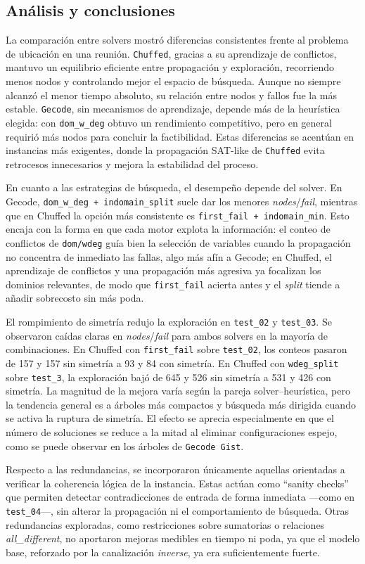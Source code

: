 
\subsection{Análisis y conclusiones}\label{sec:05-reunion-analisis-y-conclusiones}

La comparación entre solvers mostró diferencias consistentes frente al problema de ubicación en una reunión. \texttt{Chuffed}, gracias a su aprendizaje de conflictos, mantuvo un equilibrio eficiente entre propagación y exploración, recorriendo menos nodos y controlando mejor el espacio de búsqueda. Aunque no siempre alcanzó el menor tiempo absoluto, su relación entre nodos y fallos fue la más estable. \texttt{Gecode}, sin mecanismos de aprendizaje, depende más de la heurística elegida: con \texttt{dom\_w\_deg} obtuvo un rendimiento competitivo, pero en general requirió más nodos para concluir la factibilidad. Estas diferencias se acentúan en instancias más exigentes, donde la propagación SAT-like de \texttt{Chuffed} evita retrocesos innecesarios y mejora la estabilidad del proceso.

En cuanto a las estrategias de búsqueda, el desempeño depende del solver. En Gecode, \texttt{dom\_w\_deg + indomain\_split} suele dar los menores \emph{nodes}/\emph{fail}, mientras que en Chuffed la opción más consistente es \texttt{first\_fail + indomain\_min}. Esto encaja con la forma en que cada motor explota la información: el conteo de conflictos de \texttt{dom/wdeg} guía bien la selección de variables cuando la propagación no concentra de inmediato las fallas, algo más afín a Gecode; en Chuffed, el aprendizaje de conflictos y una propagación más agresiva ya focalizan los dominios relevantes, de modo que \texttt{first\_fail} acierta antes y el \emph{split} tiende a añadir sobrecosto sin más poda.

El rompimiento de simetría redujo la exploración en \texttt{test\_02} y \texttt{test\_03}. Se observaron caídas claras en \emph{nodes}/\emph{fail} para ambos solvers en la mayoría de combinaciones. En Chuffed con \texttt{first\_fail} sobre \texttt{test\_02}, los conteos pasaron de 157 y 157 sin simetría a 93 y 84 con simetría. En Chuffed con \texttt{wdeg\_split} sobre \texttt{test\_3}, la exploración bajó de 645 y 526 sin simetría a 531 y 426 con simetría. La magnitud de la mejora varía según la pareja solver–heurística, pero la tendencia general es a árboles más compactos y búsqueda más dirigida cuando se activa la ruptura de simetría. El efecto se aprecia especialmente en que el número de soluciones se reduce a la mitad al eliminar configuraciones espejo, como se puede observar en los árboles de \texttt{Gecode Gist}.

Respecto a las redundancias, se incorporaron únicamente aquellas orientadas a verificar la coherencia lógica de la instancia. Estas actúan como “sanity checks” que permiten detectar contradicciones de entrada de forma inmediata —como en \texttt{test\_04}—, sin alterar la propagación ni el comportamiento de búsqueda. Otras redundancias exploradas, como restricciones sobre sumatorias o relaciones \textit{all\_different}, no aportaron mejoras medibles en tiempo ni poda, ya que el modelo base, reforzado por la canalización \textit{inverse}, ya era suficientemente fuerte.